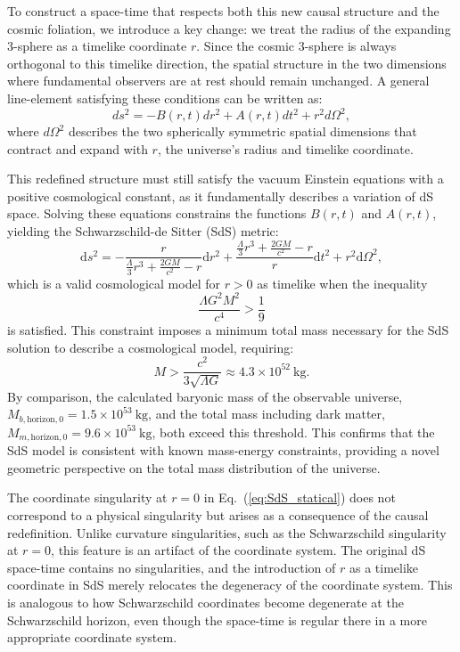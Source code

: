 \documentclass[aps,prd,reprint,superscriptaddress]{revtex4-2}
\begin{document}
To construct a space-time that respects both this new causal structure and the cosmic foliation, we introduce a key change: we treat the radius of the expanding 3-sphere as a timelike coordinate $r$. Since the cosmic 3-sphere is always orthogonal to this timelike direction, the spatial structure in the two dimensions where fundamental observers are at rest should remain unchanged. A general line-element satisfying these conditions can be written as:
\begin{equation}
    ds^2=-B(r,t)dr^2+A(r,t)dt^2+r^2d\Omega^2,\label{eq:JB}
\end{equation}
where $d\Omega^2$ describes the two spherically symmetric spatial dimensions that contract and expand with $r$, the universe's radius and timelike coordinate.

This redefined structure must still satisfy the vacuum Einstein equations with a positive cosmological constant, as it fundamentally describes a variation of dS space. Solving these equations constrains the functions $B(r,t)$ and $A(r,t)$, yielding the Schwarzschild-de Sitter (SdS) metric:
\begin{equation}
    \mathrm{d}s^2=-\frac{r}{\frac{\Lambda}{3}r^3+\frac{2GM}{c^2}-r}\mathrm{d}r^2+\frac{\frac{\Lambda}{3}r^3+\frac{2GM}{c^2}-r}{r}\mathrm{d}t^2+r^2\mathrm{d}\Omega^2,\label{eq:SdS_statical}
\end{equation}
which is a valid cosmological model for $r>0$ as timelike when the inequality
\begin{equation}
    \frac{\Lambda G^2 M^2}{c^4} > \frac{1}{9}
\end{equation}
is satisfied. This constraint imposes a minimum total mass necessary for the SdS solution to describe a cosmological model, requiring:
\begin{equation}
M > \frac{c^2}{3\sqrt{\Lambda G}} \approx 4.3 \times 10^{52}~\text{kg}.
\end{equation}
By comparison, the calculated baryonic mass of the observable universe, $M_{b,\text{horizon},0} = 1.5 \times 10^{53}~\text{kg}$, and the total mass including dark matter, $M_{m,\text{horizon},0} = 9.6 \times 10^{53}~\text{kg}$, both exceed this threshold. This confirms that the SdS model is consistent with known mass-energy constraints, providing a novel geometric perspective on the total mass distribution of the universe.

The coordinate singularity at $r=0$ in Eq.~(\ref{eq:SdS_statical}) does not correspond to a physical singularity but arises as a consequence of the causal redefinition. Unlike curvature singularities, such as the Schwarzschild singularity at $r=0$, this feature is an artifact of the coordinate system. The original dS space-time contains no singularities, and the introduction of $r$ as a timelike coordinate in SdS merely relocates the degeneracy of the coordinate system. This is analogous to how Schwarzschild coordinates become degenerate at the Schwarzschild horizon, even though the space-time is regular there in a more appropriate coordinate system.
\end{document}

